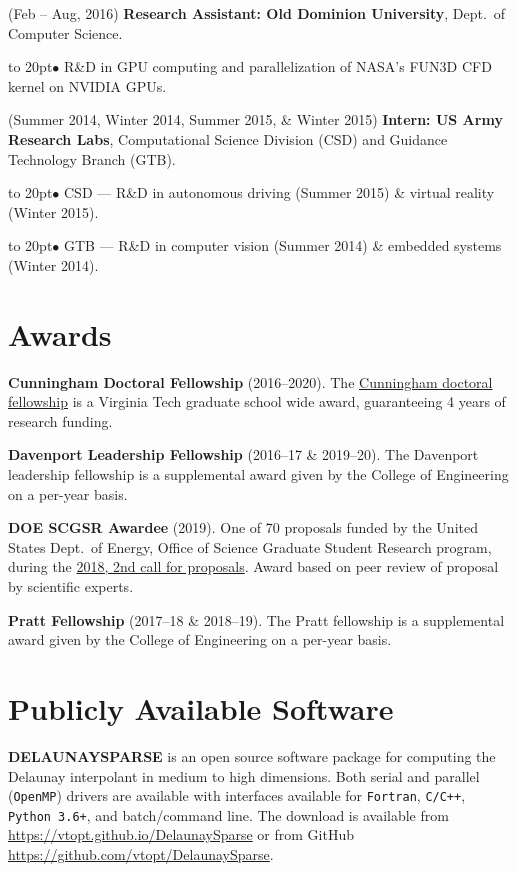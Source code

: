 \documentclass[12pt]{article}
\def\bullitem{\par\hangindent=15pt \hangafter=1
\noindent\hbox to 20pt{\hfil$\bullet$\hfil}\ignorespaces}
\begin{document}
\hangindent=0.3in
(Feb -- Aug, 2016)
\textbf{Research Assistant: Old Dominion University},
Dept.\ of Computer Science.
\bullitem
R\&D in GPU computing and parallelization of NASA's FUN3D CFD kernel on
NVIDIA GPUs.

\medskip

\hangindent=0.3in
(Summer 2014, Winter 2014, Summer 2015, \& Winter 2015)
\textbf{Intern: US Army Research Labs}, 
Computational Science Division (CSD) and Guidance Technology Branch (GTB).
\bullitem
CSD --- R\&D in autonomous driving (Summer 2015) \&
virtual reality (Winter 2015).
\bullitem
GTB --- R\&D in computer vision (Summer 2014) \& embedded systems (Winter 2014).

\newpage
\section*{Awards}

\textbf{Cunningham Doctoral Fellowship} (2016--2020).
The 
\href{https://graduateschool.vt.edu/funding/types-of-funding/funding-sponsored-by-the-graduate-school/cunningham-doctoral-assistantships.html}
{Cunningham doctoral fellowship} is a Virginia Tech graduate school wide
award, guaranteeing 4 years of research funding.

\textbf{Davenport Leadership Fellowship} (2016--17 \& 2019--20).
The Davenport leadership fellowship is a supplemental award given by
the College of Engineering on a per-year basis.

\textbf{DOE SCGSR Awardee} (2019).
One of 70 proposals funded by the United States Dept.\ of Energy,
Office of Science Graduate Student Research program, during the
\href{https://www.energy.gov/articles/doe-s-science-graduate-student-research-program-selects-70-students-pursue-research-doe}{2018, 2nd call for proposals}.
Award based on peer review of proposal by scientific experts.

\textbf{Pratt Fellowship} (2017--18 \& 2018--19).
The Pratt fellowship is a supplemental award given by
the College of Engineering on a per-year basis.

\section*{Publicly Available Software}

\textbf{DELAUNAYSPARSE} is an open source software package
for computing the Delaunay interpolant in medium to high dimensions.
Both serial and parallel (\texttt{OpenMP}) drivers are available
with interfaces available for
\texttt{Fortran},
\texttt{C/C++},
\texttt{Python 3.6+},
and batch/command line.
The download is available from \url{https://vtopt.github.io/DelaunaySparse}
or from GitHub \url{https://github.com/vtopt/DelaunaySparse}.
\end{document}

